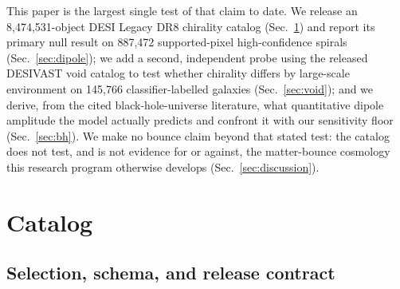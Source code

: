 \documentclass[twocolumn,linenumbers]{aastex702}
\begin{document}
This paper is the largest single test of that claim to date. We release an
8,474,531-object DESI Legacy DR8 chirality catalog (Sec.~\ref{sec:catalog})
and report its primary null result on 887,472 supported-pixel
high-confidence spirals (Sec.~\ref{sec:dipole}); we add a second,
independent probe using the released DESIVAST void catalog to test whether
chirality differs by large-scale environment on 145,766 classifier-labelled
galaxies (Sec.~\ref{sec:void}); and we derive, from the cited black-hole-universe
literature, what quantitative dipole amplitude the model actually predicts and
confront it with our sensitivity floor (Sec.~\ref{sec:bh}). We make no bounce
claim beyond that stated test: the catalog does not test, and is not evidence
for or against, the matter-bounce cosmology this research program otherwise
develops (Sec.~\ref{sec:discussion}).

\section{Catalog}
\label{sec:catalog}

\subsection{Selection, schema, and release contract}
\label{sec:catalog_schema}
\end{document}
